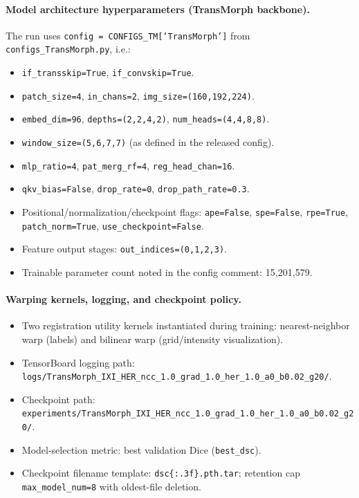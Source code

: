 \documentclass[11pt,a4paper]{article}
\begin{document}
\paragraph{Model architecture hyperparameters (TransMorph backbone).}
The run uses \texttt{config = CONFIGS\_TM['TransMorph']} from \texttt{configs\_TransMorph.py}, i.e.:
\begin{itemize}
\item \texttt{if\_transskip=True}, \texttt{if\_convskip=True}.
\item \texttt{patch\_size=4}, \texttt{in\_chans=2}, \texttt{img\_size=(160,192,224)}.
\item \texttt{embed\_dim=96}, \texttt{depths=(2,2,4,2)}, \texttt{num\_heads=(4,4,8,8)}.
\item \texttt{window\_size=(5,6,7,7)} (as defined in the released config).
\item \texttt{mlp\_ratio=4}, \texttt{pat\_merg\_rf=4}, \texttt{reg\_head\_chan=16}.
\item \texttt{qkv\_bias=False}, \texttt{drop\_rate=0}, \texttt{drop\_path\_rate=0.3}.
\item Positional/normalization/checkpoint flags: \texttt{ape=False}, \texttt{spe=False}, \texttt{rpe=True}, \texttt{patch\_norm=True}, \texttt{use\_checkpoint=False}.
\item Feature output stages: \texttt{out\_indices=(0,1,2,3)}.
\item Trainable parameter count noted in the config comment: 15,201,579.
\end{itemize}

\paragraph{Warping kernels, logging, and checkpoint policy.}
\begin{itemize}
\item Two registration utility kernels instantiated during training: nearest-neighbor warp (labels) and bilinear warp (grid/intensity visualization).
\item TensorBoard logging path: \texttt{logs/TransMorph\_IXI\_HER\_ncc\_1.0\_grad\_1.0\_her\_1.0\_a0\_b0.02\_g20/}.
\item Checkpoint path: \texttt{experiments/TransMorph\_IXI\_HER\_ncc\_1.0\_grad\_1.0\_her\_1.0\_a0\_b0.02\_g20/}.
\item Model-selection metric: best validation Dice (\texttt{best\_dsc}).
\item Checkpoint filename template: \texttt{dsc\{:.3f\}.pth.tar}; retention cap \texttt{max\_model\_num=8} with oldest-file deletion.
\end{itemize}
\end{document}
